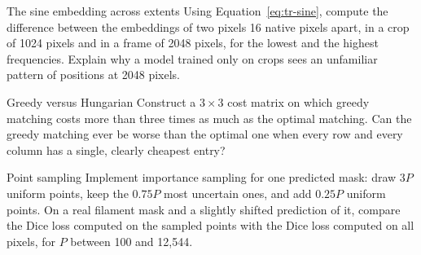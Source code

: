 \begin{exercise}{The sine embedding across extents}
Using Equation~\eqref{eq:tr-sine}, compute the difference between the embeddings of two pixels 16
native pixels apart, in a crop of 1024 pixels and in a frame of 2048 pixels, for the lowest and the
highest frequencies. Explain why a model trained only on crops sees an unfamiliar pattern of positions
at 2048 pixels.
\end{exercise}

\begin{exercise}{Greedy versus Hungarian}
Construct a $3\times3$ cost matrix on which greedy matching costs more than three times as much as the
optimal matching. Can the greedy matching ever be worse than the optimal one when every row and every
column has a single, clearly cheapest entry?
\end{exercise}

\begin{exercise}{Point sampling}
Implement importance sampling for one predicted mask: draw $3P$ uniform points, keep the $0.75P$ most
uncertain ones, and add $0.25P$ uniform points. On a real filament mask and a slightly shifted
prediction of it, compare the Dice loss computed on the sampled points with the Dice loss computed on
all pixels, for $P$ between 100 and 12,544.
\end{exercise}
